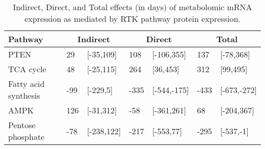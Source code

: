 \begin{table}[ht]
\centering
\begin{tabular}{lllllll}
  \hline
  Pathway & \multicolumn{2}{c}{Indirect} & \multicolumn{2}{c}{Direct}  & \multicolumn{2}{c}{Total} \\
 \hline
PTEN & 29 & [-35,109] & 108 & [-106,355] & 137 & [-78,368] \\ 
  TCA cycle & 48 & [-25,115] & 264 & [36,453] & 312 & [99,495] \\ 
  Fatty acid synthesis & -99 & [-229,5] & -335 & [-544,-175] & -433 & [-673,-272] \\ 
  AMPK & 126 & [-31,312] & -58 & [-361,261] & 68 & [-204,367] \\ 
  Pentose phosphate & -78 & [-238,122] & -217 & [-553,77] & -295 & [-537,-1] \\ 
   \hline
\end{tabular}
\caption{Indirect, Direct, and Total effects (in days) of metabolomic mRNA expression as mediated by RTK pathway protein expression.} 
\end{table}
